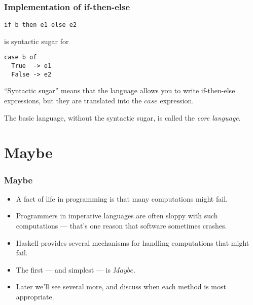\documentclass{beamer}
\begin{document}
\begin{frame}[fragile]
\frametitle{Implementation of if-then-else}

\begin{verbatim}
if b then e1 else e2
\end{verbatim}

is syntactic sugar for

\begin{verbatim}
case b of
  True  -> e1
  False -> e2
\end{verbatim}

``Syntactic sugar'' means that the language allows you to write
if-then-else expressions, but they are translated into the $case$
expression.

The basic language, without the syntactic sugar, is called the
\emph{core language}.

\end{frame}

\section{Maybe}

\begin{frame}[fragile]
\frametitle{Maybe}

\begin{itemize}
\item A fact of life in programming is that many computations might
  fail.
\item Programmers in imperative languages are often sloppy with
  such computations --- that's one reason that software sometimes
  crashes.
\item Haskell provides several mechanisms for handling computations
  that might fail.
\item The first --- and simplest --- is $Maybe$.
\item Later we'll see several more, and discuss when each method is
  most appropriate.
\end{itemize}

\end{frame}
\end{document}
